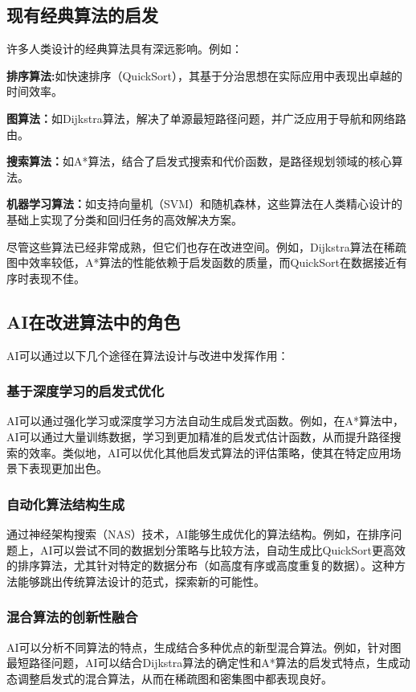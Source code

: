 \documentclass[supercite]{HustGraduPaper}
\begin{document}
	\subsection{现有经典算法的启发}
	许多人类设计的经典算法具有深远影响。例如：
	\par {\songti \bfseries 排序算法:}如快速排序（QuickSort），其基于分治思想在实际应用中表现出卓越的时间效率。
	\par {\songti \bfseries 图算法：}如Dijkstra算法，解决了单源最短路径问题，并广泛应用于导航和网络路由。
	\par {\songti \bfseries 搜索算法：}如A*算法，结合了启发式搜索和代价函数，是路径规划领域的核心算法。
	\par {\songti \bfseries 机器学习算法：}如支持向量机（SVM）和随机森林，这些算法在人类精心设计的基础上实现了分类和回归任务的高效解决方案。
	\par 尽管这些算法已经非常成熟，但它们也存在改进空间。例如，Dijkstra算法在稀疏图中效率较低，A*算法的性能依赖于启发函数的质量，而QuickSort在数据接近有序时表现不佳。

	\subsection{AI在改进算法中的角色}
	AI可以通过以下几个途径在算法设计与改进中发挥作用：
	\subsubsection{\songti \bfseries 基于深度学习的启发式优化}
	AI可以通过强化学习或深度学习方法自动生成启发式函数。例如，在A*算法中，AI可以通过大量训练数据，学习到更加精准的启发式估计函数，从而提升路径搜索的效率。类似地，AI可以优化其他启发式算法的评估策略，使其在特定应用场景下表现更加出色。
	\subsubsection{\songti \bfseries 自动化算法结构生成}
	通过神经架构搜索（NAS）技术，AI能够生成优化的算法结构。例如，在排序问题上，AI可以尝试不同的数据划分策略与比较方法，自动生成比QuickSort更高效的排序算法，尤其针对特定的数据分布（如高度有序或高度重复的数据）。这种方法能够跳出传统算法设计的范式，探索新的可能性。
	\subsubsection{\songti \bfseries 混合算法的创新性融合}
	AI可以分析不同算法的特点，生成结合多种优点的新型混合算法。例如，针对图最短路径问题，AI可以结合Dijkstra算法的确定性和A*算法的启发式特点，生成动态调整启发式的混合算法，从而在稀疏图和密集图中都表现良好。
\end{document}
